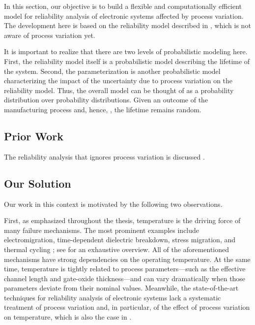In this section, our objective is to build a flexible and computationally
efficient model for reliability analysis of electronic systems affected by
process variation. The development here is based on the reliability model
described in , which is not aware of process variation
yet.

\begin{remark}
It is important to realize that there are two levels of probabilistic modeling
here. First, the reliability model itself is a probabilistic model describing
the lifetime of the system. Second, the parameterization \vg is another
probabilistic model characterizing the impact of the uncertainty due to process
variation on the reliability model. Thus, the overall model can be thought of as
a probability distribution over probability distributions. Given an outcome of
the manufacturing process and, hence, \vg, the lifetime remains random.
\end{remark}

\subsection{Prior Work}

The reliability analysis that ignores process variation is discussed
.

\subsection{Our Solution}

Our work in this context is motivated by the following two observations.

First, as emphasized throughout the thesis, temperature is the driving force of
many failure mechanisms. The most prominent examples include electromigration,
time-dependent dielectric breakdown, stress migration, and thermal cycling
\cite{xiang2010}; see \cite{jedec2016} for an exhaustive overview. All of the
aforementioned mechanisms have strong dependencies on the operating temperature.
At the same time, temperature is tightly related to process parameters---such as
the effective channel length and gate-oxide thickness---and can vary
dramatically when those parameters deviate from their nominal values. Meanwhile,
the state-of-the-art techniques for reliability analysis of electronic systems
lack a systematic treatment of process variation and, in particular, of the
effect of process variation on temperature, which is also the case in
.

